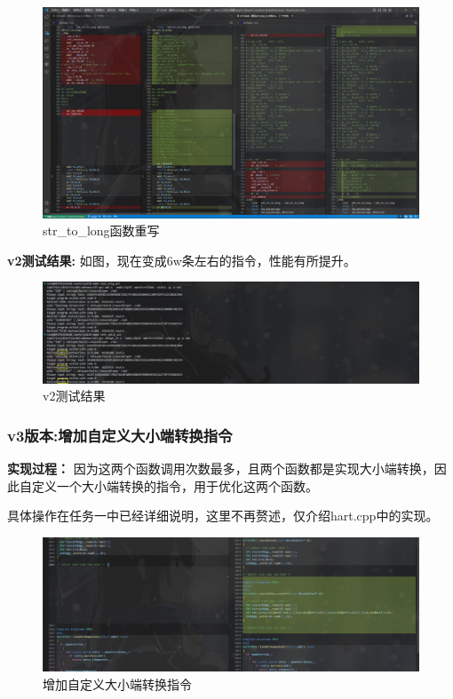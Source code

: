 \documentclass[12pt,hyperref,a4paper,UTF8]{ctexart}
\begin{document}
  \begin{figure}[H]
      \centering
      \includegraphics[width =1.0\textwidth]{figures/fig/image23.png}
      \caption{str\_to\_long函数重写}
  \end{figure}

\textbf{v2测试结果:}
  如图，现在变成6w条左右的指令，性能有所提升。
  \begin{figure}[H]
      \centering
      \includegraphics[width =1.0\textwidth]{figures/fig/image24.png}
      \caption{v2测试结果}
  \end{figure}

\newpage

\subsubsection{v3版本:增加自定义大小端转换指令}

\textbf{实现过程：}
因为这两个函数调用次数最多，且两个函数都是实现大小端转换，因此自定义一个大小端转换的指令，用于优化这两个函数。

具体操作在任务一中已经详细说明，这里不再赘述，仅介绍hart.cpp中的实现。

  \begin{figure}[H]
      \centering
      \includegraphics[width =1.0\textwidth]{figures/fig/image25.png}
      \caption{增加自定义大小端转换指令}
  \end{figure}
\end{document}
